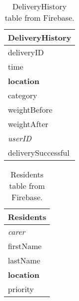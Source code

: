 \documentclass{article}
\begin{document}
\begin{table}[h]
\vskip 3mm
\begin{center}
\begin{tabular}{l}
\hline
\abovespace\belowspace
DeliveryHistory \\
\hline
  deliveryID \\
  time \\
  {\bf location} \\
  category \\
  weightBefore\\
  weightAfter\\
  {\it userID}\\
  deliverySuccessful
\end{tabular}
\caption{DeliveryHistory table from Firebase.}
\label{tab:delivery-history}
\end{center}
\vskip -3mm
\end{table}

\begin{table}[h]
\vskip 3mm
\begin{center}
\begin{tabular}{l}
\hline
\abovespace\belowspace
Residents \\
\hline
  {\it carer} \\
  firstName \\
  lastName \\
  {\bf location} \\
  priority
\end{tabular}
\caption{Residents table from Firebase.}
\label{tab:residents}
\end{center}
\vskip -3mm
\end{table}


\end{document}
